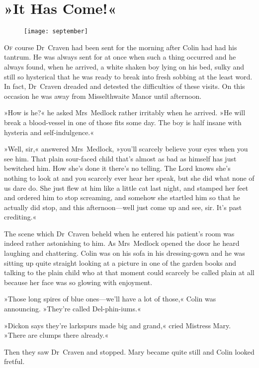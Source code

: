 \chapter{»It Has Come!«} 
	
\begin{figure}[t!]
\centering
\texttt{[image: september]}
\end{figure}

 \lettrine[lines=6]{O}{f} course Dr~Craven had been sent for the morning after Colin had had his tantrum. He was always sent for at once when such a thing occurred and he always found, when he arrived, a white shaken boy lying on his bed, sulky and still so hysterical that he was ready to break into fresh sobbing at the least word. In fact, Dr~Craven dreaded and detested the difficulties of these visits. On this occasion he was away from Misselthwaite Manor until afternoon.

»How is he?« he asked Mrs~Medlock rather irritably when he arrived. »He will break a blood-vessel in one of those fits some day. The boy is half insane with hysteria and self-indulgence.«

»Well, sir,« answered Mrs~Medlock, »you'll scarcely believe your eyes when you see him. That plain sour-faced child that's almost as bad as himself has just bewitched him. How she's done it there's no telling. The Lord knows she's nothing to look at and you scarcely ever hear her speak, but she did what none of us dare do. She just flew at him like a little cat last night, and stamped her feet and ordered him to stop screaming, and somehow she startled him so that he actually did stop, and this afternoon—well just come up and see, sir. It's past crediting.«

The scene which Dr~Craven beheld when he entered his patient's room was indeed rather astonishing to him. As Mrs~Medlock opened the door he heard laughing and chattering. Colin was on his sofa in his dressing-gown and he was sitting up quite straight looking at a picture in one of the garden books and talking to the plain child who at that moment could scarcely be called plain at all because her face was so glowing with enjoyment.

»Those long spires of blue ones—we'll have a lot of those,« Colin was announcing. »They're called Del-phin-iums.«

»Dickon says they're larkspurs made big and grand,« cried Mistress Mary. »There are clumps there already.«

Then they saw Dr~Craven and stopped. Mary became quite still and Colin looked fretful.

